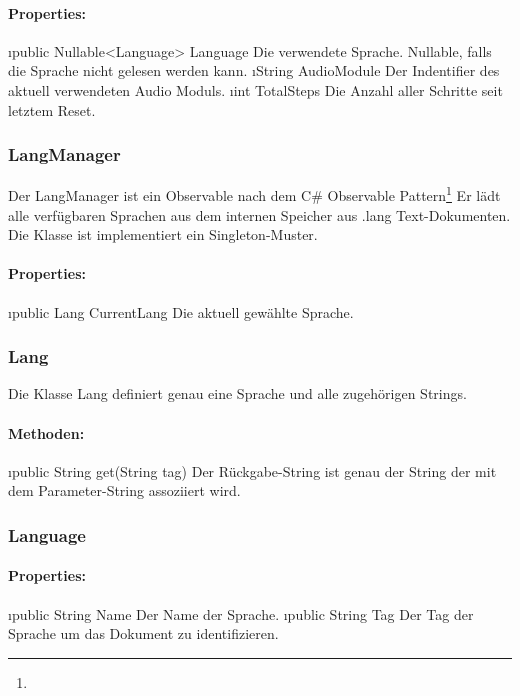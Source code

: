 \documentclass[../entwurf.tex]{subfiles}
\begin{document}
				\paragraph{Properties:}
					\begin{itemize}
						\i{public Nullable<Language> Language} Die verwendete Sprache. Nullable, falls die Sprache nicht gelesen werden kann.
						\i{String AudioModule} Der Indentifier des aktuell verwendeten Audio Moduls.
						\i{int TotalSteps} Die Anzahl aller Schritte seit letztem Reset.
					\end{itemize}
			\subsubsection{LangManager}
				Der LangManager ist ein Observable nach dem 
				C\# Observable Pattern\footnote{}
				Er lädt alle verfügbaren Sprachen aus dem internen Speicher aus .lang Text-Dokumenten.
				Die Klasse ist implementiert ein Singleton-Muster.
				\paragraph{Properties:}
					\begin{itemize}
						\i{public Lang CurrentLang} Die aktuell gewählte Sprache.
					\end{itemize}
			\subsubsection{Lang}
				Die Klasse Lang definiert genau eine Sprache und alle zugehörigen Strings. 
				\paragraph{Methoden:}
					\begin{itemize}
						\i{public String get(String tag)} Der Rückgabe-String ist genau der String der mit dem Parameter-String assoziiert wird.
					\end{itemize}
			\subsubsection{Language}
				\paragraph{Properties:}
					\begin{itemize}
						\i{public String Name} Der Name der Sprache.
						\i{public String Tag} Der Tag der Sprache um das Dokument zu identifizieren.
					\end{itemize}
\end{document}
